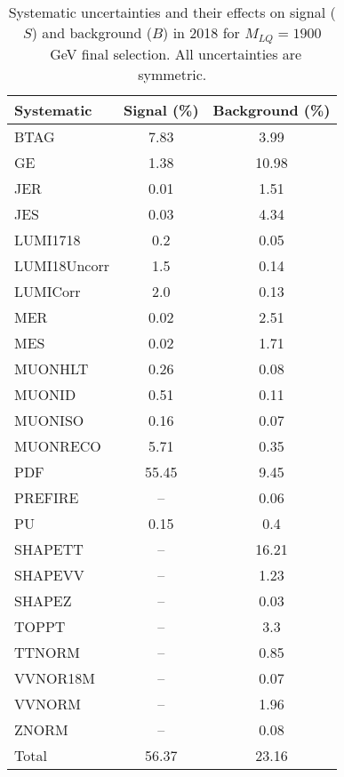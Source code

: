 \begin{table}[htbp]
\begin{center}
\caption{Systematic uncertainties and their effects on signal ($S$) and background ($B$) in 2018 for $M_{LQ}=1900$~GeV final selection. All uncertainties are symmetric.}
\begin{tabular}{lcc}
\hline\hline
Systematic & Signal (\%) & Background (\%) \\ \hline 
BTAG & 7.83 & 3.99\\ 
GE & 1.38 & 10.98\\ 
JER & 0.01 & 1.51\\ 
JES & 0.03 & 4.34\\ 
LUMI1718 & 0.2 & 0.05\\ 
LUMI18Uncorr & 1.5 & 0.14\\ 
LUMICorr & 2.0 & 0.13\\ 
MER & 0.02 & 2.51\\ 
MES & 0.02 & 1.71\\ 
MUONHLT & 0.26 & 0.08\\ 
MUONID & 0.51 & 0.11\\ 
MUONISO & 0.16 & 0.07\\ 
MUONRECO & 5.71 & 0.35\\ 
PDF & 55.45 & 9.45\\ 
PREFIRE & -- & 0.06\\ 
PU & 0.15 & 0.4\\ 
SHAPETT & -- & 16.21\\ 
SHAPEVV & -- & 1.23\\ 
SHAPEZ & -- & 0.03\\ 
TOPPT & -- & 3.3\\ 
TTNORM & -- & 0.85\\ 
VVNOR18M & -- & 0.07\\ 
VVNORM & -- & 1.96\\ 
ZNORM & -- & 0.08\\ 
Total & 56.37 & 23.16\\ \hline \hline
\end{tabular}
\label{tab:SysUncertainties_uujj_1900}
\end{center}
\end{table}


